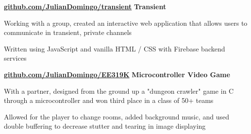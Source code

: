     \begin{cventries}
        \cventry
            {\normalsize \textbf{\url{github.com/JulianDomingo/transient}}}
            {\normalsize \textbf{Transient}}
            {}
            {}
            {
                \begin{cvitems}
                    \item {\normalsize Working with a group, created an interactive web application that allows users to communicate in transient, private channels}
                    \item {\normalsize Written using JavaScript and vanilla HTML / CSS with Firebase backend services}
                \end{cvitems}
            }
        \cventry
            {\normalsize \textbf{\url{github.com/JulianDomingo/EE319K}}}
            {\normalsize \textbf{Microcontroller Video Game}}
            {}
            {}
            {
                \begin{cvitems}
                    \item {\normalsize With a partner, designed from the ground up a "dungeon crawler" game in C through a microcontroller and won third place in a class of 50+ teams}
                    \item {\normalsize Allowed for the player to change rooms, added background music, and used double buffering to decrease stutter and tearing in image displaying}
                \end{cvitems}
            }
    \end{cventries}
